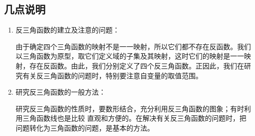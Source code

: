 















































































































\subsection{几点说明}
\begin{enumerate}
\item 反三角函数的建立及注意的问题：

由于确定四个三角函数的映射不是一一映射，所以它们都不存在反函数。我们以三角函数为原型，取它们定义域的子集及其映射，这时它们的映射是一一映射，存在反函数。由此，我们分别定义了四个反三角函数。正因此，我们在研究有关反三角函数的问题时，特别要注意自变量的取值范围。
\item 研究反三角函数的一般方法：

研究反三角函数的性质时，要数形结合，充分利用反三角函数的图象；有时利用三角函数线也是比较 直观和方便的。在解决有关反三角函数的问题时，把问题转化为三角函数的问题，是基本的方法。
\end{enumerate}

